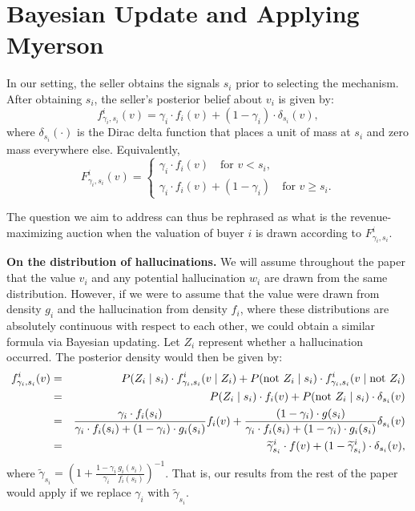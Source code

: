 \section{Bayesian Update and Applying Myerson}\label{sec:failure_myerson}


In our setting, the seller obtains the signals $s_i$ prior to selecting the mechanism. After obtaining $s_i$, the seller's posterior belief about $v_i$ is given by:
\begin{equation}\label{eq:density-f} f_{\gamma_i,s_i}^i(v) = \gamma_i \cdot f_i(v) + (1-\gamma_i)\cdot \delta_{s_i}(v),\end{equation}
where $\delta_{s_i}(\cdot)$ is the Dirac delta function that places a unit of mass at $s_i$ and zero mass everywhere else. Equivalently, 
\begin{equation}\label{eq:cumulative-F}
F_{\gamma_i,s_i}^i(v) = \begin{cases}
\gamma_i \cdot f_i(v) \quad \text{for $v<s_i$},\\
\gamma_i \cdot f_i(v) + (1-\gamma_i) \quad \text{for $v \geq s_i$}.
\end{cases}
\end{equation}

The question we aim to address can thus be rephrased as what is the revenue-maximizing auction when the valuation of buyer $i$ is drawn according to $F_{\gamma_i,s_i}^i$. 

\vspace{.1in}
\noindent \textbf{On the distribution of hallucinations.} We will assume throughout the paper that the value $v_i$ and any potential hallucination $w_i$ are drawn from the same distribution. However, if we were to assume that the value were drawn from density $g_i$ and the hallucination from density $f_i$, where these distributions are absolutely continuous with respect to each other, we could obtain a similar formula via Bayesian updating. Let $Z_i$ represent whether a hallucination occurred. The posterior density would then be given by:
\begin{eqnarray*}
    f_{\gamma_i,s_i}^i(v) &=&  P(Z_i \mid s_i) \cdot f_{\gamma_i,s_i}^i(v \mid Z_i) +  P(\hbox{not } Z_i \mid s_i) \cdot f_{\gamma_i,s_i}^i(v \mid \hbox{not }Z_i)\\ 
    &=& P(Z_i \mid s_i)\cdot f_i(v) + P(\hbox{not }Z_i \mid s_i)\cdot \delta_{s_i}(v)\\ 
    &=& \frac{\gamma_i \cdot f_i(s_i)}{\gamma_i \cdot f_i(s_i) + (1-\gamma_i) \cdot g_i(s_i)}f_i(v) + \frac{(1-\gamma_i) \cdot g(s_i)}{\gamma_i \cdot f_i(s_i) + (1-\gamma_i) \cdot g_i(s_i)}\delta_{s_i}(v)\\
    &=& \widetilde {\gamma}^i_{s_i} \cdot f(v) + (1-\widetilde {\gamma}^i_{s_i}) \cdot \delta_{s_i}(v), 
\end{eqnarray*}
where
$\widetilde \gamma_{s_i} = \left(1+\frac{1-\gamma_i}{\gamma_i}\frac{g_i(s_i)}{f_i(s_i)}\right)^{-1}$. That is, our results from the rest of the paper would apply if we replace $\gamma_i$ with $\widetilde \gamma_{s_i}$.

